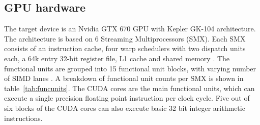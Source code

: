 \documentclass[11pt, oneside, a4paper]{article}
\begin{document}













\subsection{GPU hardware} %
\label{sub:introduction_to_the_gk_104}

The target device is an Nvidia GTX 670 GPU with Kepler GK-104 architecture. The architecture is based on 6 Streaming Multiprocessors (SMX). Each SMX consists of an instruction cache, four warp schedulers with two dispatch units each, a 64k entry 32-bit register file, L1 cache and shared memory \cite{GK-104 Whitepaper}. The functional units are grouped into 15 functional unit blocks, with varying number of SIMD lanes \cite{Anand}. A breakdown of functional unit counts per SMX is shown in table~\ref{tab:funcunits}. The CUDA cores are the main functional units, which can execute a single precision floating point instruction per clock cycle. Five out of six blocks of the CUDA cores can also execute basic 32 bit integer arithmetic instructions.
\end{document}
